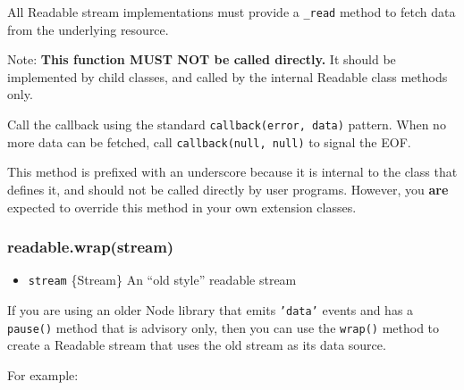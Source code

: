 All Readable stream implementations must provide a \texttt{\_read}
method to fetch data from the underlying resource.

Note: \textbf{This function MUST NOT be called directly.} It should be
implemented by child classes, and called by the internal Readable class
methods only.

Call the callback using the standard \texttt{callback(error, data)}
pattern. When no more data can be fetched, call
\texttt{callback(null, null)} to signal the EOF.

This method is prefixed with an underscore because it is internal to the
class that defines it, and should not be called directly by user
programs. However, you \textbf{are} expected to override this method in
your own extension classes.

\subsubsection{readable.wrap(stream)}

\begin{itemize}
\item
  \texttt{stream} \{Stream\} An ``old style'' readable stream
\end{itemize}

If you are using an older Node library that emits \texttt{'data'} events
and has a \texttt{pause()} method that is advisory only, then you can
use the \texttt{wrap()} method to create a Readable stream that uses the
old stream as its data source.

For example:

\begin{Shaded}
\begin{Highlighting}[]
 \NormalTok{;}
  
 \NormalTok{;}
  

\NormalTok{(}\NormalTok{, }\NormalTok{() \{}
  \NormalTok{(); }
\NormalTok{\});}
\end{Highlighting}
\end{Shaded}

